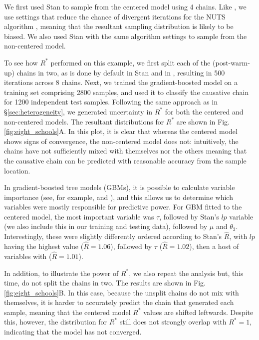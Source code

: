 \documentclass{article}
\begin{document}
We first used Stan \cite{carpenter2017stan} to sample from the centered model using 4 chains. Like \cite{vehtari2019rank}, we use settings that reduce the chance of divergent iterations for the NUTS algorithm \cite{hoffman2014no}, meaning that the resultant sampling distribution is likely to be biased. We also used Stan with the same algorithm settings to sample from the non-centered model.

To see how $R^*$ performed on this example, we first split each of the (post-warm-up) chains in two, as is done by default in Stan \cite{carpenter2017stan} and in \cite{vehtari2019rank}, resulting in 500 iterations across 8 chains. Next, we trained the gradient-boosted model on a training set comprising 2800 samples, and used it to classify the causative chain for 1200 independent test samples. Following the same approach as in \S\ref{sec:heterogeneity}, we generated uncertainty in $R^*$ for both the centered and non-centered models. The resultant distributions for $R^*$ are shown in Fig.\ref{fig:eight_schools}A. In this plot, it is clear that whereas the centered model shows signs of convergence, the non-centered model does not: intuitively, the chains have not sufficiently mixed with themselves nor the others meaning that the causative chain can be predicted with reasonable accuracy from the sample location.

In gradient-boosted tree models (GBMs), it is possible to calculate variable importance (see, for example, \cite{friedman2001greedy} and \cite{greenwell2019package}), and this allows us to determine which variables were mostly responsible for predictive power. For GBM fitted to the centered model, the most important variable was $\tau$, followed by Stan's $lp$ variable (we also include this in our training and testing data), followed by $\mu$ and $\theta_2$. Interestingly, these were slightly differently ordered according to Stan's $\hat{R}$, with $lp$ having the highest value ($\hat R = 1.06$), followed by $\tau$ ($\hat R = 1.02$), then a host of variables with ($\hat R = 1.01$).

In addition, to illustrate the power of $R^*$, we also repeat the analysis but, this time, do not split the chains in two. The results are shown in Fig.\ref{fig:eight_schools}B. In this case, because the unsplit chains do not mix with themselves, it is harder to accurately predict the chain that generated each sample, meaning that the centered model $R^*$ values are shifted leftwards. Despite this, however, the distribution for $R^*$ still does not strongly overlap with $R^*=1$, indicating that the model has not converged.
\end{document}
